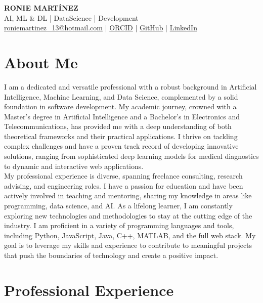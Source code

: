 \documentclass[11pt,a4paper]{article}
\begin{document}
\begin{center}
    {\huge \textbf{RONIE MARTÍNEZ}} \\[0.5em]
    AI, ML \& DL | DataScience | Development \\[0.2em]
    \href{mailto:roniemartinez_13@hotmail.com}{roniemartinez\_13@hotmail.com} |
    \href{https://orcid.org/0009-0003-9640-3225}{ORCID} |
    \href{https://github.com/MrOnie}{GitHub} |
    \href{https://www.linkedin.com/in/ronie-martínez-4bb9a184/}{LinkedIn}
\end{center}

\section*{About Me}
I am a dedicated and versatile professional with a robust background in Artificial Intelligence, Machine Learning, and Data Science, complemented by a solid foundation in software development. My academic journey, crowned with a Master's degree in Artificial Intelligence and a Bachelor's in Electronics and Telecommunications, has provided me with a deep understanding of both theoretical frameworks and their practical applications. I thrive on tackling complex challenges and have a proven track record of developing innovative solutions, ranging from sophisticated deep learning models for medical diagnostics to dynamic and interactive web applications.\\[0.5em]
My professional experience is diverse, spanning freelance consulting, research advising, and engineering roles. I have a passion for education and have been actively involved in teaching and mentoring, sharing my knowledge in areas like programming, data science, and AI. As a lifelong learner, I am constantly exploring new technologies and methodologies to stay at the cutting edge of the industry. I am proficient in a variety of programming languages and tools, including Python, JavaScript, Java, C++, MATLAB, and the full web stack. My goal is to leverage my skills and experience to contribute to meaningful projects that push the boundaries of technology and create a positive impact.

\section*{Professional Experience}
\end{document}
